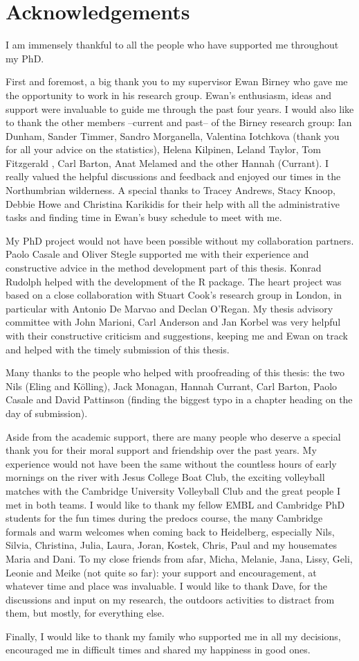 \documentclass{thesis}
\begin{document}
\chapter*{Acknowledgements}
I am immensely thankful to all the people who have supported me throughout my PhD.

First and foremost, a big thank you to my supervisor Ewan Birney who gave me the opportunity to work in his research group. Ewan's enthusiasm, ideas and support were invaluable to guide me through the past four years. I would also like to thank the other members --current and past-- of the Birney research group: Ian Dunham, Sander Timmer, Sandro Morganella, Valentina Iotchkova (thank you for all your advice on the statistics), Helena Kilpinen, Leland Taylor, Tom Fitzgerald , Carl Barton, Anat Melamed and the other Hannah (Currant). I really valued the helpful discussions and feedback and enjoyed our times in the Northumbrian wilderness. A special thanks to Tracey Andrews, Stacy Knoop, Debbie Howe and Christina Karikidis for their help with all the administrative tasks and finding time in Ewan's busy schedule to meet with me.

My PhD project would not have been possible without my collaboration partners. Paolo Casale and Oliver Stegle supported me with their experience and constructive advice in the method development part of this thesis. Konrad Rudolph helped with the development of the R package. The heart project was based on a close collaboration with Stuart Cook's research group in London, in particular with Antonio De Marvao and Declan O'Regan. My thesis advisory committee with John Marioni, Carl Anderson and Jan Korbel was very helpful with their constructive criticism and suggestions, keeping me and Ewan on track and helped with the timely submission of this thesis. 

Many thanks to the people who helped with proofreading of this thesis: the two Nils (Eling and K\"olling), Jack Monagan, Hannah Currant, Carl Barton, Paolo Casale and David Pattinson (finding the biggest typo in a chapter heading on the day of submission).

Aside from the academic support, there are many people who deserve a special thank you for their moral support and friendship over the past years. My experience would not have been the same without the countless hours of early mornings on the river with Jesus College Boat Club, the exciting volleyball matches with the Cambridge University Volleyball Club and the great people I met in both teams. I would like to thank my fellow EMBL and Cambridge PhD students for the fun times during the predocs course, the many Cambridge formals and warm welcomes when coming back to Heidelberg, especially Nils, Silvia, Christina, Julia, Laura, Joran, Kostek, Chris, Paul and my housemates Maria and Dani. To my close friends from afar, Micha, Melanie, Jana, Lissy, Geli, Leonie and Meike (not quite so far): your support and encouragement, at whatever time and place was invaluable. I would like to thank Dave, for the discussions and input on my research, the outdoors activities to distract from them, but mostly, for everything else. 

Finally, I would like to thank my family who supported me in all my decisions, encouraged me in difficult times and shared my happiness in good ones. 
\end{document}
